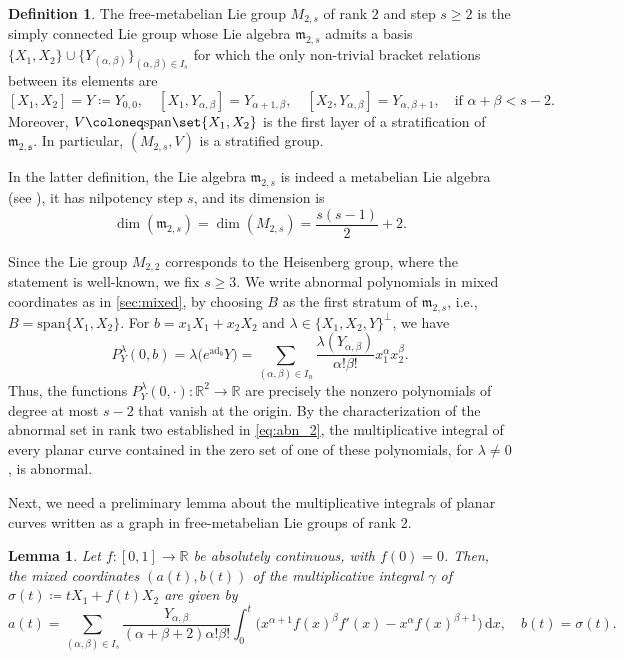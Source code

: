 \documentclass[a4paper,11pt,reqno]{amsart}
\theoremstyle{plain}
\newtheorem{lemma}[theorem]{Lemma}
\theoremstyle{definition}
\newtheorem{definition}[theorem]{Definition}
\newcommand{\R}{\mathbb R}
\newcommand{\spn}{\mathrm{span}}
\newcommand{\de}{\mathrm{d}}
\newcommand{\ad}{\mathrm{ad}}
\begin{document}
\begin{definition}
     The free-metabelian Lie group $M_{2,s}$ of rank $2$ and step $s \ge 2$ is the simply connected Lie group whose Lie algebra $\mathfrak{m}_{2,s}$ admits a basis 
     $\{X_1,X_2\} \cup \{Y_{(\alpha,\beta)}\}_{(\alpha,\beta) \in I_s}$ for which the only non-trivial bracket relations between its elements are
     \begin{equation} \label{eq:relation_free}
         [X_1,X_2]=Y \coloneq  Y_{0,0}, \quad [X_1,Y_{\alpha,\beta}]=Y_{\alpha+1,\beta}, \quad [X_2,Y_{\alpha,\beta}] =Y_{\alpha,\beta+1}, \quad \text{if $\alpha+\beta < s-2$.}
     \end{equation}
     Moreover, $V \coloneq  \spn\set{X_1,X_2}$ is the first layer of a stratification of $\mathfrak{m_{2,s}}$. In particular, $(M_{2,s},V)$ is a stratified group.
\end{definition}

In the latter definition, the Lie algebra $\mathfrak{m}_{2,s}$ is indeed a metabelian Lie algebra (see \cite{MR159847,MR2905023}), it has nilpotency step $s$, and its dimension is \begin{equation*}
   \dim(\mathfrak{m}_{2,s}) = \dim(M_{2,s}) = \frac{s(s-1)}{2} +2.
  \end{equation*} 

Since the Lie group $M_{2,2}$ corresponds to the Heisenberg group, where the statement is well-known, we fix $s\geq 3$. We write abnormal polynomials in mixed coordinates as in \cref{sec:mixed}, by choosing $B$ as the first stratum of $\mathfrak{m}_{2,s}$, i.e., $B=\spn\{X_1,X_2\}$.
For $b=x_1X_1+x_2X_2$ and $\lambda\in\{X_1,X_2,Y\}^{\perp}$, we have
\[
 P_Y^\lambda(0,b)
 =\lambda\bigl(e^{\ad_b}Y\bigr)
 =\sum_{(\alpha,\beta)\in I_n}
   \frac{\lambda(Y_{\alpha,\beta})}{\alpha!\beta!}x_1^\alpha x_2^\beta.
\]
Thus, the functions $P_Y^\lambda(0,\cdot) \colon \R^2 \to \R$ are precisely the nonzero
polynomials of degree at most $s-2$ that vanish at the origin. By the characterization of the abnormal set in rank two established in \eqref{eq:abn_2}, the multiplicative integral of every planar curve contained in the zero set of one of these polynomials, for $\lambda \neq 0$, is abnormal.

Next, we need a preliminary lemma about the multiplicative integrals of planar curves written as a graph in free-metabelian Lie groups of rank $2$.

\begin{lemma} \label{multiplicative_graph}
    Let $f \colon [0,1] \to \R$ be absolutely continuous, with $f(0)=0$. Then, the mixed coordinates $(a(t),b(t))$ of the multiplicative integral $\gamma$ of $\sigma(t) \coloneq  tX_1 + f(t)X_2$ are given by
    \begin{equation*}
        a(t)= \sum_{(\alpha,\beta) \in I_s} \frac{Y_{\alpha,\beta}}{(\alpha+\beta+2)\alpha!\beta!}\int^t_0 \bigg(x^{\alpha+1}f(x)^\beta f'(x) - x^\alpha f(x)^{\beta+1}\bigg)\, \de x , \quad b(t) = \sigma(t).
    \end{equation*}
\end{lemma}
\end{document}
